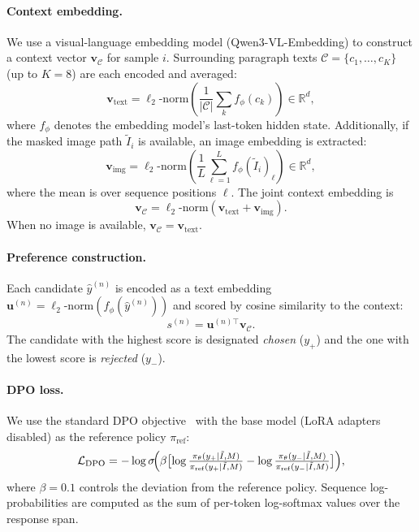 \documentclass[uplatex,10pt,twocolumn,a4paper]{article}
\begin{document}
\paragraph{Context embedding.}
We use a visual-language embedding model (Qwen3-VL-Embedding) to
construct a context vector $\mathbf{v}_\mathcal{C}$ for sample $i$.
Surrounding paragraph texts $\mathcal{C} = \{c_1, \ldots, c_K\}$
(up to $K=8$) are each encoded and averaged:
\begin{equation}
  \mathbf{v}_\text{text} = \ell_2\text{-norm}\!\left(
    \frac{1}{|\mathcal{C}|}\sum_{k} f_\phi(c_k)
  \right) \in \mathbb{R}^d,
  \label{eq:text_embed}
\end{equation}
where $f_\phi$ denotes the embedding model's last-token hidden state.
Additionally, if the masked image path $\tilde{I}_i$ is available, an
image embedding is extracted:
\begin{equation}
  \mathbf{v}_\text{img} = \ell_2\text{-norm}\!\left(
    \frac{1}{L}\sum_{\ell=1}^{L} f_\phi(\tilde{I}_i)_\ell
  \right) \in \mathbb{R}^d,
  \label{eq:img_embed}
\end{equation}
where the mean is over sequence positions $\ell$.
The joint context embedding is
\begin{equation}
  \mathbf{v}_\mathcal{C} = \ell_2\text{-norm}
    (\mathbf{v}_\text{text} + \mathbf{v}_\text{img}).
  \label{eq:joint_embed}
\end{equation}
When no image is available, $\mathbf{v}_\mathcal{C} = \mathbf{v}_\text{text}$.

\paragraph{Preference construction.}
Each candidate $\hat{y}^{(n)}$ is encoded as a text embedding
$\mathbf{u}^{(n)} = \ell_2\text{-norm}(f_\phi(\hat{y}^{(n)}))$ and
scored by cosine similarity to the context:
\begin{equation}
  s^{(n)} = \mathbf{u}^{(n)\top} \mathbf{v}_\mathcal{C}.
  \label{eq:score_dpo}
\end{equation}
The candidate with the highest score is designated
\emph{chosen} ($y_+$) and the one with the lowest score is
\emph{rejected} ($y_-$).

\paragraph{DPO loss.}
We use the standard DPO objective~\cite{dpo2023} with the base model
(LoRA adapters disabled) as the reference policy $\pi_\mathrm{ref}$:
\begin{equation}
  \mathcal{L}_\mathrm{DPO} = -\log\sigma\!\Bigl(
    \beta \bigl[
      \log\tfrac{\pi_\theta(y_+ \mid \tilde{I}, M)}
                {\pi_\mathrm{ref}(y_+ \mid \tilde{I}, M)}
      -
      \log\tfrac{\pi_\theta(y_- \mid \tilde{I}, M)}
                {\pi_\mathrm{ref}(y_- \mid \tilde{I}, M)}
    \bigr]
  \Bigr),
  \label{eq:dpo}
\end{equation}
where $\beta=0.1$ controls the deviation from the reference policy.
Sequence log-probabilities are computed as the sum of per-token
log-softmax values over the response span.
\end{document}
